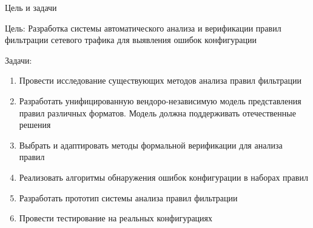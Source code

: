 \documentclass[10pt]{beamer}
\begin{document}
\begin{frame}{Цель и задачи}
    \begin{block}{Цель:}
        Разработка системы автоматического анализа и верификации правил фильтрации
        сетевого трафика для выявления ошибок конфигурации
    \end{block}

    \begin{block}{Задачи:}
        \begin{enumerate}
            \item Провести исследование существующих методов анализа правил фильтрации
            \item Разработать унифицированную вендоро-независимую модель представления правил различных форматов.
            Модель должна поддерживать отечественные решения
            \item Выбрать и адаптировать методы формальной верификации для анализа правил
            \item Реализовать алгоритмы обнаружения ошибок конфигурации в наборах правил
            \item Разработать прототип системы анализа правил фильтрации
            \item Провести тестирование на реальных конфигурациях
        \end{enumerate}
    \end{block}
\end{frame}
\end{document}

